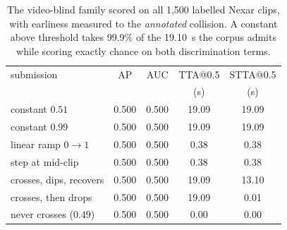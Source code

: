\begin{table}[t]
\caption{The video-blind family scored on all 1,500 labelled Nexar clips,
with earliness measured to the \emph{annotated} collision. A constant above
threshold takes 99.9\% of the \SI{19.10}{\second} the corpus admits while
scoring exactly chance on both discrimination terms.}
\label{tab:nexar-blind}
\centering
\begin{tabular}{@{}lcccc@{}}
\toprule
submission & AP & AUC & TTA@0.5 & STTA@0.5 \\
 &  &  & (s) & (s) \\
\midrule
constant $0.51$ & 0.500 & 0.500 & 19.09 & 19.09 \\
constant $0.99$ & 0.500 & 0.500 & 19.09 & 19.09 \\
linear ramp $0\!\to\!1$ & 0.500 & 0.500 & 0.38 & 0.38 \\
step at mid-clip & 0.500 & 0.500 & 0.38 & 0.38 \\
crosses, dips, recovers & 0.500 & 0.500 & 19.09 & 13.10 \\
crosses, then drops & 0.500 & 0.500 & 19.09 & 0.01 \\
never crosses ($0.49$) & 0.500 & 0.500 & 0.00 & 0.00 \\
\bottomrule
\end{tabular}
\end{table}

